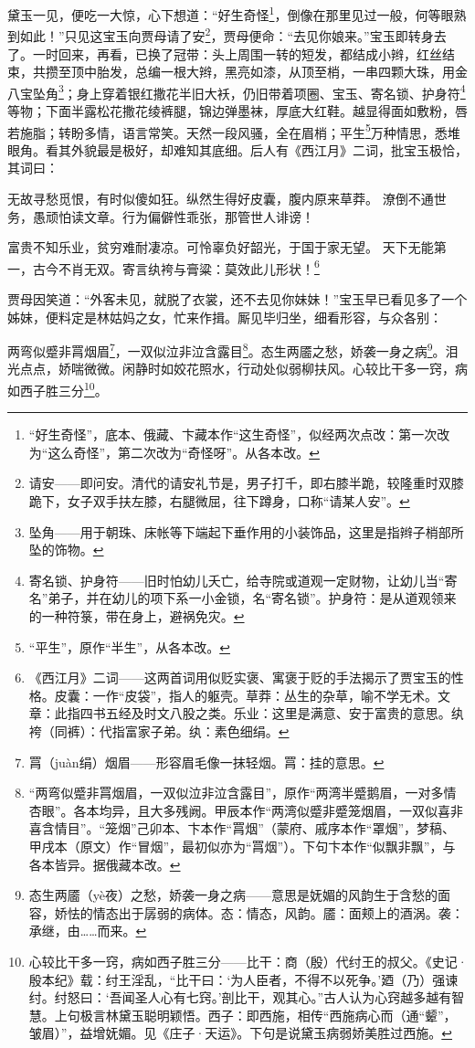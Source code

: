 \par 黛玉一见，便吃一大惊，心下想道：“好生奇怪\footnote{“好生奇怪”，底本、俄藏、卞藏本作“这生奇怪”，似经两次点改：第一次改为“这么奇怪”，第二次改为“奇怪呀”。从各本改。}，倒像在那里见过一般，何等眼熟到如此！”只见这宝玉向贾母请了安\footnote{请安——即问安。清代的请安礼节是，男子打千，即右膝半跪，较隆重时双膝跪下，女子双手扶左膝，右腿微屈，往下蹲身，口称“请某人安”。}，贾母便命：“去见你娘来。”宝玉即转身去了。一时回来，再看，已换了冠带：头上周围一转的短发，都结成小辫，红丝结束，共攒至顶中胎发，总编一根大辫，黑亮如漆，从顶至梢，一串四颗大珠，用金八宝坠角\footnote{坠角——用于朝珠、床帐等下端起下垂作用的小装饰品，这里是指辫子梢部所坠的饰物。}；身上穿着银红撒花半旧大袄，仍旧带着项圈、宝玉、寄名锁、护身符\footnote{寄名锁、护身符——旧时怕幼儿夭亡，给寺院或道观一定财物，让幼儿当“寄名”弟子，并在幼儿的项下系一小金锁，名“寄名锁”。护身符：是从道观领来的一种符箓，带在身上，避祸免灾。}等物；下面半露松花撒花绫裤腿，锦边弹墨袜，厚底大红鞋。越显得面如敷粉，唇若施脂；转盼多情，语言常笑。天然一段风骚，全在眉梢；平生\footnote{ “平生”，原作“半生”，从各本改。}万种情思，悉堆眼角。看其外貌最是极好，却难知其底细。后人有《西江月》二词，批宝玉极恰，其词曰：
\par 无故寻愁觅恨，有时似傻如狂。纵然生得好皮囊，腹内原来草莽。 潦倒不通世务，愚顽怕读文章。行为偏僻性乖张，那管世人诽谤！
\par 富贵不知乐业，贫穷难耐凄凉。可怜辜负好韶光，于国于家无望。 天下无能第一，古今不肖无双。寄言纨袴与膏粱：莫效此儿形状！\footnote{《西江月》二词——这两首词用似贬实褒、寓褒于贬的手法揭示了贾宝玉的性格。皮囊：一作“皮袋”，指人的躯壳。草莽：丛生的杂草，喻不学无术。文章：此指四书五经及时文八股之类。乐业：这里是满意、安于富贵的意思。纨袴（同裤）：代指富家子弟。纨：素色细绢。}
\par 贾母因笑道：“外客未见，就脱了衣裳，还不去见你妹妹！”宝玉早已看见多了一个姊妹，便料定是林姑妈之女，忙来作揖。厮见毕归坐，细看形容，与众各别：
\par 两弯似蹙非罥烟眉\footnote{罥（juàn绢）烟眉——形容眉毛像一抹轻烟。罥：挂的意思。}，一双似泣非泣含露目\footnote{“两弯似蹙非罥烟眉，一双似泣非泣含露目”，原作“两湾半蹙鹅眉，一对多情杏眼”。各本均异，且大多残阙。甲辰本作“两湾似蹙非蹙笼烟眉，一双似喜非喜含情目”。“笼烟”己卯本、卞本作“罥烟”（蒙府、戚序本作“罩烟”，梦稿、甲戌本（原文）作“冒烟”，最初似亦为“罥烟”）。下句卞本作“似飘非飘”，与各本皆异。据俄藏本改。}。态生两靥之愁，娇袭一身之病\footnote{态生两靥（yè夜）之愁，娇袭一身之病——意思是妩媚的风韵生于含愁的面容，娇怯的情态出于孱弱的病体。态：情态，风韵。靥：面颊上的酒涡。袭：承继，由……而来。}。泪光点点，娇喘微微。闲静时如姣花照水，行动处似弱柳扶风。心较比干多一窍，病如西子胜三分\footnote{心较比干多一窍，病如西子胜三分——比干：商（殷）代纣王的叔父。《史记·殷本纪》载：纣王淫乱，“比干曰：‘为人臣者，不得不以死争。’廼（乃）强谏纣。纣怒曰：‘吾闻圣人心有七窍。’剖比干，观其心。”古人认为心窍越多越有智慧。上句极言林黛玉聪明颖悟。西子：即西施，相传“西施病心而（通“颦”，皱眉）”，益增妩媚。见《庄子·天运》。下句是说黛玉病弱娇美胜过西施。}。
